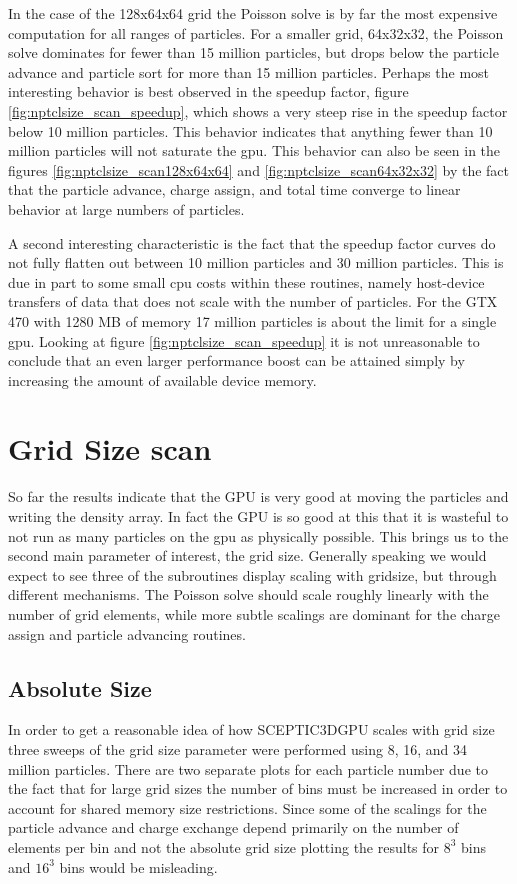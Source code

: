 In the case of the 128x64x64 grid the Poisson solve is by far the most expensive computation for all ranges of particles. For a smaller grid, 64x32x32, the Poisson solve dominates for fewer than 15 million particles, but drops below the particle advance and particle sort for more than 15 million particles. Perhaps the most interesting behavior is best observed in the speedup factor, figure \ref{fig:nptclsize_scan_speedup}, which shows a very steep rise in the speedup factor below 10 million particles. This behavior indicates that anything fewer than 10 million particles will not saturate the gpu. This behavior can also be seen in the figures \ref{fig:nptclsize_scan128x64x64} and \ref{fig:nptclsize_scan64x32x32} by the fact that the particle advance, charge assign, and total time converge to linear behavior at large numbers of particles. 

A second interesting characteristic is the fact that the speedup factor curves do not fully flatten out between 10 million particles and 30 million particles. This is due in part to some small cpu costs within these routines, namely host-device transfers of data that does not scale with the number of particles. For the GTX 470 with 1280 MB of memory 17 million particles is about the limit for a single gpu. Looking at figure \ref{fig:nptclsize_scan_speedup} it is not unreasonable to conclude that an even larger performance boost can be attained simply by increasing the amount of available device memory.

	
\section{Grid Size scan}
So far the results indicate that the GPU is very good at moving the particles and writing the density array. In fact the GPU is so good at this that it is wasteful to not run as many particles on the gpu as physically possible. This brings us to the second main parameter of interest, the grid size. Generally speaking we would expect to see three of the subroutines display scaling with gridsize, but through different mechanisms. The Poisson solve should scale roughly linearly with the number of grid elements, while more subtle scalings are dominant for the charge assign and particle advancing routines. 

	\subsection{Absolute Size}
	In order to get a reasonable idea of how SCEPTIC3DGPU scales with grid size three sweeps of the grid size parameter were performed using 8, 16, and 34 million particles. There are two separate plots for each particle number due to the fact that for large grid sizes the number of bins must be increased in order to account for shared memory size restrictions. Since some of the scalings for the particle advance and charge exchange depend primarily on the number of elements per bin and not the absolute grid size plotting the results for $8^3$ bins and $16^3$ bins would be misleading.

